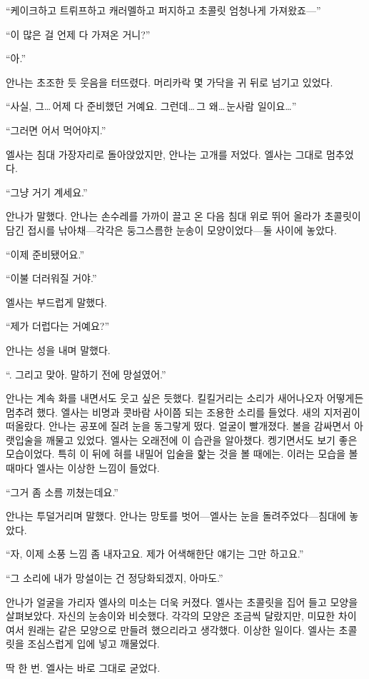 ``케이크하고 트뤼프하고 캐러멜하고 퍼지하고 초콜릿 엄청나게 가져왔죠—''

``이 많은 걸 언제 다 가져온 거니?''

``아.''

안나는 초조한 듯 웃음을 터뜨렸다. 머리카락 몇 가닥을 귀 뒤로 넘기고 있었다.

``사실, 그\ldots\,어제 다 준비했던 거예요. 그런데\ldots\,그 왜\ldots\,눈사람 일이요\ldots''

``그러면 어서 먹어야지.''

엘사는 침대 가장자리로 돌아앉았지만, 안나는 고개를 저었다. 엘사는 그대로 멈추었다.

``그냥 거기 계세요.''

안나가 말했다. 안나는 손수레를 가까이 끌고 온 다음 침대 위로 뛰어 올라가 초콜릿이 담긴 접시를 낚아채—각각은 둥그스름한 눈송이 모양이었다—둘 사이에 놓았다.

``이제 준비됐어요.''

``이불 더러워질 거야.''

엘사는 부드럽게 말했다.

``제가 더럽다는 거예요?''

안나는 성을 내며 말했다.

``. 그리고 맞아. 말하기 전에 망설였어.''

안나는 계속 화를 내면서도 웃고 싶은 듯했다. 킬킬거리는 소리가 새어나오자 어떻게든 멈추려 했다. 엘사는 비명과 콧바람 사이쯤 되는 조용한 소리를 들었다. 새의 지저귐이 떠올랐다. 안나는 공포에 질려 눈을 동그랗게 떴다. 얼굴이 빨개졌다. 볼을 감싸면서 아랫입술을 깨물고 있었다. 엘사는 오래전에 이 습관을 알아챘다. 켕기면서도 보기 좋은 모습이었다. 특히 이 뒤에 혀를 내밀어 입술을 핥는 것을 볼 때에는. 이러는 모습을 볼 때마다 엘사는 이상한 느낌이 들었다.

``그거 좀 소름 끼쳤는데요.''

안나는 투덜거리며 말했다. 안나는 망토를 벗어—엘사는 눈을 돌려주었다—침대에 놓았다.

``자, 이제 소풍 느낌 좀 내자고요. 제가 어색해한단 얘기는 그만 하고요.''

``그 소리에 내가 망설이는 건 정당화되겠지, 아마도.''

안나가 얼굴을 가리자 엘사의 미소는 더욱 커졌다. 엘사는 초콜릿을 집어 들고 모양을 살펴보았다. 자신의 눈송이와 비슷했다. 각각의 모양은 조금씩 달랐지만, 미묘한 차이여서 원래는 같은 모양으로 만들려 했으리라고 생각했다. 이상한 일이다. 엘사는 초콜릿을 조심스럽게 입에 넣고 깨물었다.

딱 한 번. 엘사는 바로 그대로 굳었다.

